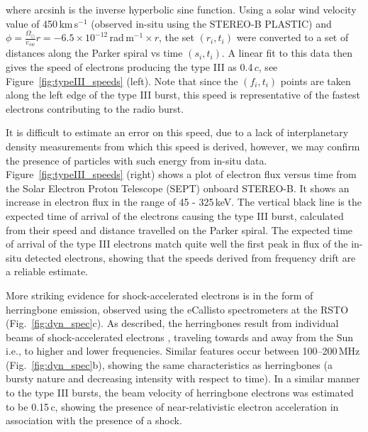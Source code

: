 \noindent
where arcsinh is the inverse hyperbolic sine function. Using a solar wind velocity value of 450\,km\,s$^{-1}$ (observed in-situ using the STEREO-B PLASTIC) and $\phi=\frac{ \Omega_{\odot}}{v_{sw}}r=-6.5\times10^{-12}$\,rad\,m$^{-1}\times r$, the set $(r_i,t_i)$ were converted to a set of distances along the Parker spiral vs time $(s_i, t_i)$. A linear fit to this data then gives the speed of electrons producing the type III as 0.4\,$c$, see Figure~\ref{fig:typeIII_speeds} (left). Note that since the $(f_i, t_i)$ points are taken along the left edge of the type III burst, this speed is representative of the fastest electrons contributing to the radio burst. 


It is difficult to estimate an error on this speed, due to a lack of interplanetary density measurements from which this speed is derived, however, we may confirm the presence of particles with such energy from in-situ data. Figure~\ref{fig:typeIII_speeds} (right) shows a plot of electron flux versus time from the Solar Electron Proton Telescope (SEPT)\citep{muller2008} onboard STEREO-B. It shows an increase in electron flux in the range of 45 - 325\,keV. The vertical black line is the expected time of arrival of the electrons causing the type III burst, calculated from their speed and distance travelled on the Parker spiral. The expected time of arrival of the type III electrons match quite well the first peak in flux of the in-situ detected electrons, showing that the speeds derived from frequency drift are a reliable estimate. 

More striking evidence for shock-accelerated electrons is in the form of herringbone emission, observed using the eCallisto spectrometers at the RSTO (Fig.~\ref{fig:dyn_spec}c). As described, the herringbones result from individual beams of shock-accelerated electrons \citep{mann2005}, traveling towards and away from the Sun  i.e., to higher and lower frequencies. Similar features occur between 100--200\,MHz (Fig.~\ref{fig:dyn_spec}b), showing the same characteristics as herringbones (a bursty nature and decreasing intensity with respect to time). In a similar manner to the type III bursts, the beam velocity of herringbone electrons was estimated to be 0.15\,c, showing the presence of near-relativistic electron acceleration in association with the presence of a shock. 


